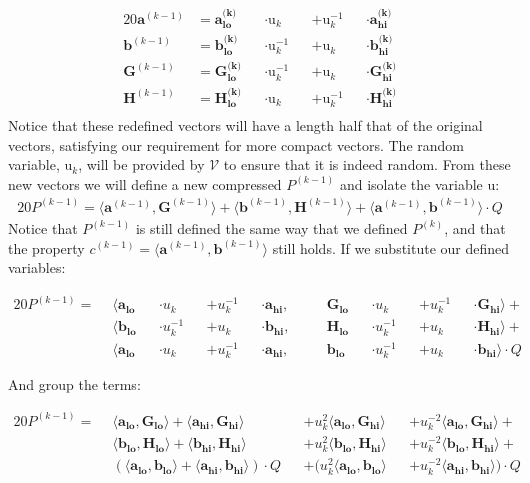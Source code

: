 \documentclass{article}
\newcommand{\eq}[1]{\begin{alignat*}{20}#1\end{alignat*}}
\renewcommand{\vec}[1]{\boldsymbol{#1}}
\newcommand{\ran}[1]{\mathrm{#1}}
\newcommand{\V}{\mathcal{V}}
\newcommand{\dotp}[2]{\langle #1, #2 \rangle}
\newcommand{\opn}[1]{\operatorname{#1}}
\newcommand{\veclo}[1]{\vec{#1_{\opn{lo}}}}
\newcommand{\vechi}[1]{\vec{#1_{\opn{hi}}}}
\begin{document}
\eq{
	\vec{a}^{(k-1)} &= \veclo{a^{\text{(k)}}} &&\cdot \ran{u}_k      &&+ \ran{u}^{-1}_k &&\cdot \vechi{a^{\text{(k)}}} \\
	\vec{b}^{(k-1)} &= \veclo{b^{\text{(k)}}} &&\cdot \ran{u}^{-1}_k &&+ \ran{u}_k      &&\cdot \vechi{b^{\text{(k)}}} \\
	\vec{G}^{(k-1)} &= \veclo{G^{\text{(k)}}} &&\cdot \ran{u}^{-1}_k &&+ \ran{u}_k      &&\cdot \vechi{G^{\text{(k)}}} \\
	\vec{H}^{(k-1)} &= \veclo{H^{\text{(k)}}} &&\cdot \ran{u}_k      &&+ \ran{u}^{-1}_k &&\cdot \vechi{H^{\text{(k)}}} \\
}
Notice that these redefined vectors will have a length half that
of the original vectors, satisfying our requirement for more compact
vectors. The random variable, $\ran{u}_k$, will be provided by $\V$
to ensure that it is indeed random. From these new vectors we will
define a new compressed $P^{(k-1)}$ and isolate the variable $\ran{u}$:
\eq{
	P^{(k-1)} =
	\dotp{\vec{a}^{(k-1)}}{\vec{G}^{(k-1)}} +
	\dotp{\vec{b}^{(k-1)}}{\vec{H}^{(k-1)}} +
	\dotp{\vec{a}^{(k-1)}}{\vec{b}^{(k-1)}} \cdot Q
}
Notice that $P^{(k-1)}$ is still defined the same way
that we defined $P^{(k)}$, and that the property $c^{(k-1)} =
\dotp{\vec{a}^{(k-1)}}{\vec{b}^{(k-1)}}$ still holds. If we substitute
our defined variables:

\eq{
	P^{(k-1)} = \: \:
	&\dotp
		{        \veclo{a} &&\cdot u_k      &&+ u_k^{-1} &&\cdot \vechi{a}}
		{&&\quad \veclo{G} &&\cdot u_k      &&+ u_k^{-1} &&\cdot \vechi{G}}
	+ \\
	&\dotp
		{        \veclo{b} &&\cdot u_k^{-1} &&+ u_k      &&\cdot \vechi{b}}
		{&&\quad \veclo{H} &&\cdot u_k^{-1} &&+ u_k      &&\cdot \vechi{H}}
	+ \\
	&\dotp
		{        \veclo{a} &&\cdot u_k      &&+ u_k^{-1} &&\cdot \vechi{a}}
		{&&\quad \veclo{b} &&\cdot u_k^{-1} &&+ u_k      &&\cdot \vechi{b}}
	\cdot Q
}

And group the terms:

\eq{
	P^{(k-1)} = \: \:
	        &\dotp{\veclo{a}}{\veclo{G}}            +
	         \dotp{\vechi{a}}{\vechi{G}}          &&+
	u^2_k    \dotp{\veclo{a}}{\vechi{G}}          &&+
	u^{-2}_k \dotp{\veclo{a}}{\vechi{G}}            +\\
	        &\dotp{\veclo{b}}{\veclo{H}}            +
	         \dotp{\vechi{b}}{\vechi{H}}          &&+
	u^2_k    \dotp{\veclo{b}}{\vechi{H}}          &&+
	u^{-2}_k \dotp{\veclo{b}}{\vechi{H}}            +\\
	       &(\dotp{\veclo{a}}{\veclo{b}}            +
		       \dotp{\vechi{a}}{\vechi{b}}) \cdot Q &&+
	(u^2_k   \dotp{\veclo{a}}{\veclo{b}}          &&+
	u^{-2}_k \dotp{\vechi{a}}{\vechi{b}}) \cdot Q
}
\end{document}
